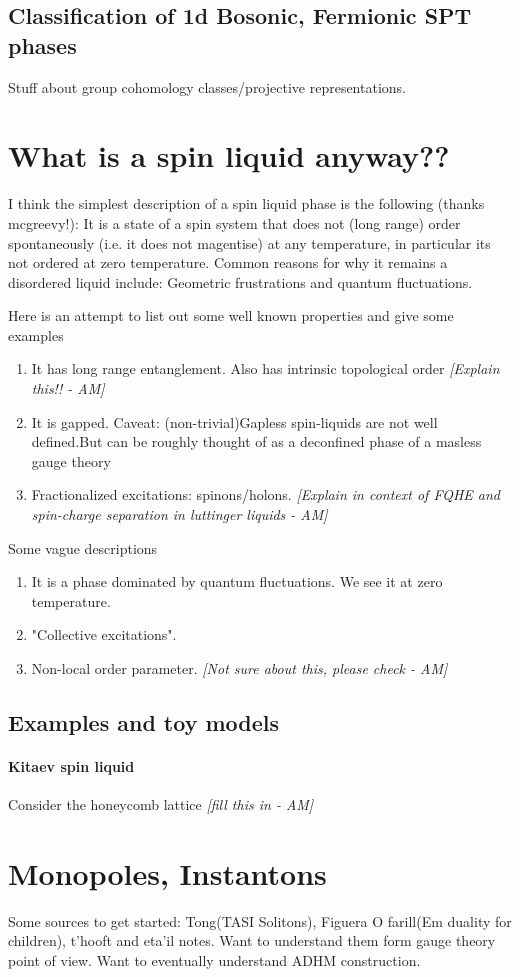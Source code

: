 \documentclass{article}
\newcommand\AM[1]{{\it \color{darkblue}  [#1 - AM]}}
\begin{document}
\subsection{Classification of 1d Bosonic, Fermionic SPT phases}
Stuff about group cohomology classes/projective representations.
\section{What is a spin liquid anyway??}
I think the simplest description of a spin liquid phase is the following (thanks mcgreevy!):
It is a state of a spin system that does not (long range) order spontaneously (i.e. it does not magentise) at any temperature, in particular its not ordered at zero temperature. Common reasons for why it remains a disordered liquid include: Geometric frustrations and quantum fluctuations. 

Here is an attempt to list out some well known properties and give some examples 
\begin{enumerate}
    \item It has long range entanglement. Also has intrinsic topological order \AM{Explain this!!}
    \item It is gapped. Caveat: (non-trivial)Gapless spin-liquids are not well defined.But can be roughly thought of as a deconfined phase of a masless gauge theory
    \item Fractionalized excitations: spinons/holons. \AM{Explain in context of FQHE and spin-charge separation in luttinger liquids}
\end{enumerate}
Some vague descriptions
\begin{enumerate}
    \item It is a phase dominated by quantum fluctuations. We see it at zero temperature.
    \item "Collective excitations".
    \item Non-local order parameter. \AM{Not sure about this, please check}
\end{enumerate}
\subsection{Examples and toy models}
\paragraph{Kitaev spin liquid}
Consider the honeycomb lattice \AM{fill this in}
\section{Monopoles, Instantons}
Some sources to get started: Tong(TASI Solitons), Figuera O farill(Em duality for children), t'hooft and eta'il notes. Want to understand them form gauge theory point of view.  Want to eventually understand ADHM construction. 
\end{document}
